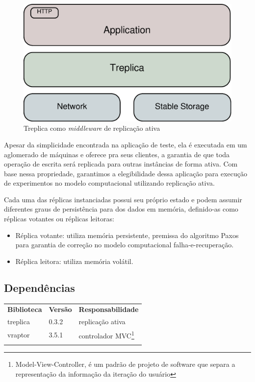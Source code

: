 \begin{figure}[ht]
  \centering
  \includegraphics[width=12cm]{conteudo/capitulos/figuras/block-treplica.eps}
  \caption{Treplica como \emph{middleware} de replicação ativa}
  \label{fig:treplica_como_middleware}
\end{figure}

Apesar da simplicidade encontrada na aplicação de teste, ela é executada em um aglomerado
de máquinas e oferece pra seus clientes, a garantia de que toda operação de escrita será
replicada para outras instâncias de forma ativa. Com base nessa propriedade, garantimos a
elegibilidade dessa aplicação para execução de experimentos no modelo computacional
utilizando replicação ativa.

Cada uma das réplicas instanciadas possui seu próprio estado e podem assumir diferentes
graus de persistência para dos dados em memória, definido-as como réplicas votantes ou
réplicas leitoras:

\begin{itemize}
  \item Réplica votante: utiliza memória persistente, premissa do algoritmo Paxos para
    garantia de correção no modelo computacional falha-e-recuperação.
  \item Réplica leitora: utiliza memória volátil.
\end{itemize}

\subsection{Dependências}

\begin{table}[h]
\begin{tabular}{lll}
\rowcolor[HTML]{EFEFEF}
\textbf{Biblioteca} & \textbf{Versão} & \textbf{Responsabilidade} \\
treplica            & 0.3.2           & replicação ativa          \\
vraptor             & 3.5.1           & controlador MVC\footnote{Model-View-Controller, é
um padrão de projeto de software que separa a representação da informação da iteração do
usuário} \\
                    &                 &
\end{tabular}
\end{table}


